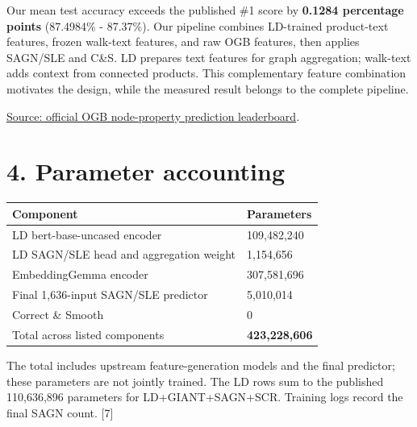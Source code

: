 \documentclass[10pt]{article}
\begin{document}
Our mean test accuracy exceeds the published \#1 score by \textbf{0.1284 percentage points} (87.4984\% - 87.37\%). Our pipeline combines LD-trained product-text features, frozen walk-text features, and raw OGB features, then applies SAGN/SLE and C\&S. LD prepares text features for graph aggregation; walk-text adds context from connected products. This complementary feature combination motivates the design, while the measured result belongs to the complete pipeline.\par

{\small \href{https://ogb.stanford.edu/docs/leader_nodeprop/#ogbn-products}{Source: official OGB node-property prediction leaderboard}.\par}

\newpage

\section*{4. Parameter accounting}

\begin{longtable}{@{}p{4.88in}p{1.88in}@{}}

\toprule

Component & Parameters \\

\midrule

LD bert-base-uncased encoder & 109,482,240 \\

LD SAGN/SLE head and aggregation weight & 1,154,656 \\

EmbeddingGemma encoder & 307,581,696 \\

Final 1,636-input SAGN/SLE predictor & 5,010,014 \\

Correct \& Smooth & 0 \\

Total across listed components & \textbf{423,228,606} \\

\bottomrule\end{longtable}

{\small The total includes upstream feature-generation models and the final predictor; these parameters are not jointly trained. The LD rows sum to the published 110,636,896 parameters for LD+GIANT+SAGN+SCR. Training logs record the final SAGN count. [7]\par}
\end{document}

